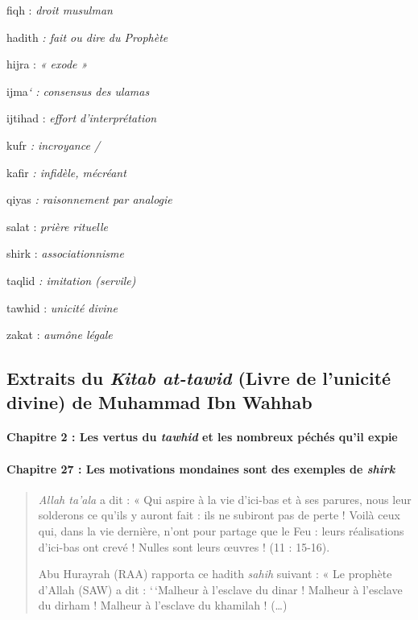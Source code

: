 fiqh : \emph{droit musulman}

hadith \emph{: fait ou dire du Prophète}

hijra : \emph{« exode »}

ijma\emph{` : consensus des ulamas}

ijtihad : \emph{effort d'interprétation}

kufr \emph{: incroyance /} 

kafir \emph{: infidèle, mécréant}

qiyas \emph{: raisonnement par analogie}

salat : \emph{prière rituelle} 

shirk : \emph{associationnisme} 

taqlid
\emph{: imitation (servile)} 

tawhid : \emph{unicité divine}

zakat :
\emph{aumône légale}

\subsection{Extraits du \emph{Kitab at-tawid} (Livre de
l'unicité divine) de Muhammad Ibn Wahhab}

\paragraph{{Chapitre 2} : Les vertus du \emph{tawhid} et les
nombreux péchés qu'il expie}



\paragraph{{Chapitre 27} : Les motivations mondaines sont des
exemples de \emph{shirk}}
\begin{quote}
\emph{Allah ta'ala} a dit : « Qui aspire à la vie d'ici-bas et à ses
parures, nous leur solderons ce qu'ils y auront fait : ils ne subiront
pas de perte ! Voilà ceux qui, dans la vie dernière, n'ont pour partage
que le Feu : leurs réalisations d'ici-bas ont crevé ! Nulles sont leurs
œuvres ! (11 : 15-16).

Abu Hurayrah (RAA) rapporta ce hadith \emph{sahih} suivant : « Le
prophète d'Allah (SAW) a dit : `\,`Malheur à l'esclave du dinar !
Malheur à l'esclave du dirham ! Malheur à l'esclave du khamilah !
(\ldots)
\end{quote}
